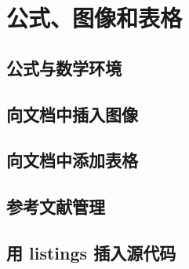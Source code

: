 \chapter{公式、图像和表格}
\section{公式与数学环境}
\section{向文档中插入图像}
\section{向文档中添加表格}
\section{参考文献管理}
\section{用 listings 插入源代码}
